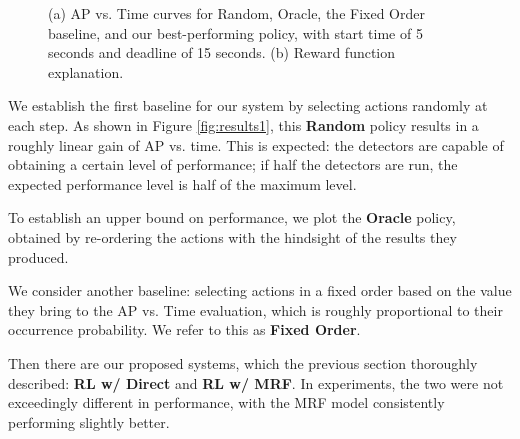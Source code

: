 \begin{figure}[h!]
\centering
{} \hfill
{}
\caption{(a) AP vs. Time curves for Random, Oracle, the Fixed Order baseline, and our best-performing policy, with start time of 5 seconds and deadline of 15 seconds. (b) Reward function explanation.}
\end{figure}

We establish the first baseline for our system by selecting actions randomly at each step.
As shown in Figure \autoref{fig:results1}, this \textbf{Random} policy results in a roughly linear gain of AP vs. time.
This is expected: the detectors are capable of obtaining a certain level of performance; if half the detectors are run, the expected performance level is half of the maximum level.

To establish an upper bound on performance, we plot the \textbf{Oracle} policy, obtained by re-ordering the actions with the hindsight of the results they produced.

We consider another baseline: selecting actions in a fixed order based on the value they bring to the AP vs. Time evaluation, which is roughly proportional to their occurrence probability.
We refer to this as \textbf{Fixed Order}.

Then there are our proposed systems, which the previous section thoroughly described: \textbf{RL w/ Direct} and \textbf{RL w/ MRF}.
In experiments, the two were not exceedingly different in performance, with the MRF model consistently performing slightly better.

